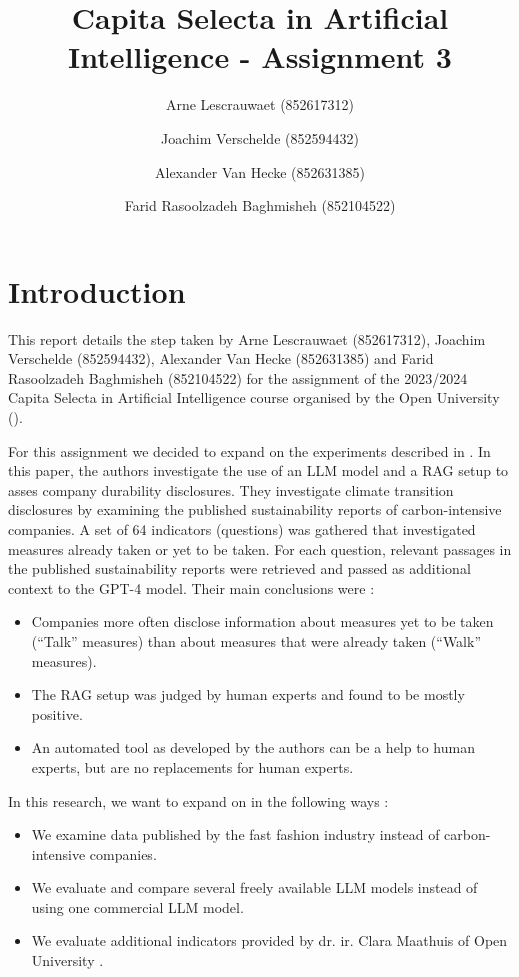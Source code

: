 \documentclass[]{article}
\title{Capita Selecta in Artificial Intelligence - Assignment 3}
\author{Arne Lescrauwaet \small(852617312) \and Joachim Verschelde \small(852594432) \and Alexander Van Hecke \small(852631385) \and Farid Rasoolzadeh Baghmisheh \small(852104522)}
\begin{document}
\maketitle

\section{Introduction}
This report details the step taken by Arne Lescrauwaet (852617312), Joachim Verschelde (852594432), Alexander Van Hecke (852631385) and Farid Rasoolzadeh Baghmisheh (852104522) for the assignment of the 2023/2024 Capita Selecta in Artificial Intelligence course organised by the Open University (\cite{ou}).

For this assignment we decided to expand on the experiments described in \cite{durability}.
In this paper, the authors investigate the use of an LLM model and a RAG setup \cite{rag} to asses company durability disclosures.
They investigate climate transition disclosures by examining the published sustainability reports of carbon-intensive companies.
A set of 64 indicators (questions) was gathered that investigated measures already taken or yet to be taken.
For each question, relevant passages in the published sustainability reports were retrieved and passed as additional context to the GPT-4 model.
Their main conclusions were :

\begin{itemize}
    \item Companies more often disclose information about measures yet to be taken (``Talk'' measures) than about measures that were already taken (``Walk'' measures).
    \item The RAG setup was judged by human experts and found to be mostly positive.
    \item An automated tool as developed by the authors can be a help to human experts, but are no replacements for human experts.
\end{itemize}

In this research, we want to expand on \cite{durability} in the following ways :

\begin{itemize}
    \item We examine data published by the fast fashion industry instead of carbon-intensive companies.
    \item We evaluate and compare several freely available LLM models instead of using one commercial LLM model.
    \item We evaluate additional indicators provided by dr. ir. Clara Maathuis of Open University \cite{ou}.
\end{itemize}
\end{document}
